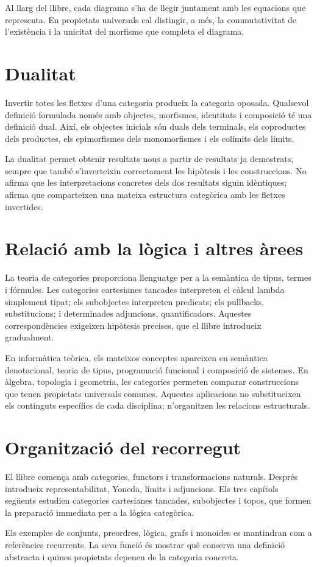 Al llarg del llibre, cada diagrama s'ha de llegir juntament amb les equacions que representa. En propietats universals cal distingir, a més, la commutativitat de l'existència i la unicitat del morfisme que completa el diagrama.

\section{Dualitat}

Invertir totes les fletxes d'una categoria produeix la categoria oposada. Qualsevol definició formulada només amb objectes, morfismes, identitats i composició té una definició dual. Així, els objectes inicials són duals dels terminals, els coproductes dels productes, els epimorfismes dels monomorfismes i els colímits dels límits.

La dualitat permet obtenir resultats nous a partir de resultats ja demostrats, sempre que també s'inverteixin correctament les hipòtesis i les construccions. No afirma que les interpretacions concretes dels dos resultats siguin idèntiques; afirma que comparteixen una mateixa estructura categòrica amb les fletxes invertides.

\section{Relació amb la lògica i altres àrees}

La teoria de categories proporciona llenguatge per a la semàntica de tipus, termes i fórmules. Les categories cartesianes tancades interpreten el càlcul lambda simplement tipat; els subobjectes interpreten predicats; els pullbacks, substitucions; i determinades adjuncions, quantificadors. Aquestes correspondències exigeixen hipòtesis precises, que el llibre introdueix gradualment.

En informàtica teòrica, els mateixos conceptes apareixen en semàntica denotacional, teoria de tipus, programació funcional i composició de sistemes. En àlgebra, topologia i geometria, les categories permeten comparar construccions que tenen propietats universals comunes. Aquestes aplicacions no substitueixen els continguts específics de cada disciplina; n'organitzen les relacions estructurals.

\section{Organització del recorregut}

El llibre comença amb categories, functors i transformacions naturals. Després introdueix representabilitat, Yoneda, límits i adjuncions. Els tres capítols següents estudien categories cartesianes tancades, subobjectes i topos, que formen la preparació immediata per a la lògica categòrica.

Els exemples de conjunts, preordres, lògica, grafs i monoides es mantindran com a referències recurrents. La seva funció és mostrar què conserva una definició abstracta i quines propietats depenen de la categoria concreta.

\endgroup 